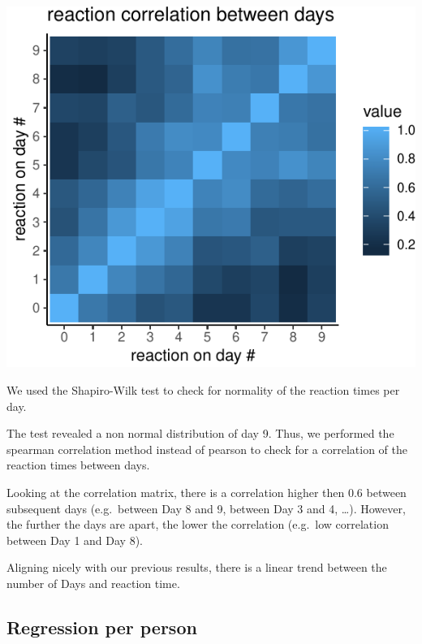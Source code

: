 \documentclass[
]{article}
\begin{document}
\begin{center}\includegraphics[width=0.8\linewidth]{Common_sleep_files/figure-latex/spearman_tile-1} \end{center}

We used the Shapiro-Wilk test to check for normality of the reaction
times per day.

The test revealed a non normal distribution of day 9. Thus, we performed
the spearman correlation method instead of pearson to check for a
correlation of the reaction times between days.

Looking at the correlation matrix, there is a correlation higher then
0.6 between subsequent days (e.g.~between Day 8 and 9, between Day 3 and
4, \ldots). However, the further the days are apart, the lower the
correlation (e.g.~low correlation between Day 1 and Day 8).

Aligning nicely with our previous results, there is a linear trend
between the number of Days and reaction time.

\hypertarget{regression-per-person}{%
\subsection{Regression per person}\label{regression-per-person}}
\end{document}
